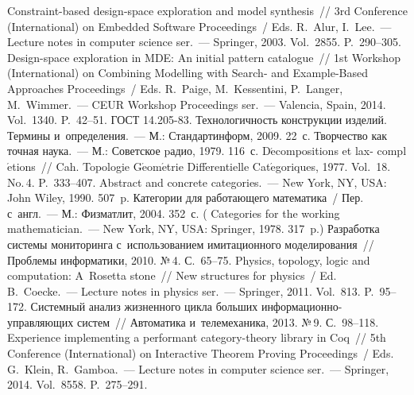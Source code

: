 \begin{multicols}{2}
{{\begin{thebibliography}{99}
 Constraint-based design-space exploration 
and model synthesis~// 3rd Conference (International) on Embedded Software Proceedings~/ Eds. 
R.~Alur, I.~Lee.~--- Lecture notes in computer science ser.~--- Springer, 2003. 
Vol.~2855. P.~290--305.
 Design-space exploration in 
MDE: An initial pattern catalogue~// 1st Workshop (International) on Combining Modelling with 
Search- and Example-Based Approaches Proceedings~/ Eds. R.~Paige, M.~Kessentini, P.~Langer, 
M.~Wimmer.~--- CEUR Workshop Proceedings ser.~---  Valencia, Spain, 2014. Vol.~1340. 
P.~42--51.
ГОСТ 14.205-83. Технологичность конструкции изделий. Термины и~определения.~--- М.: 
Стандартинформ, 2009. 22~с.
 Творчество как точная наука.~--- М.: Советское pадио, 1979. 116~с.
 D$\acute{\mbox{e}}$compositions et lax-
compl$\acute{\mbox{e}}$tions~// Cah. Topologie G$\acute{\mbox{e}}$om$\acute{\mbox{e}}$trie Diff$\acute{\mbox{e}}$rentielle 
Cat$\acute{\mbox{e}}$goriques, 1977. Vol.~18. No.\,4. P.~333--407.
 Abstract and concrete 
categories.~--- New York, NY, USA: John Wiley, 1990. 507~p.
 Категории для работающего математика~/ Пер. с~англ.~--- М.: Физматлит, 
2004. 352~с. ( Categories for the working mathematician.~--- New York, NY, 
USA: Springer, 1978. 317~p.)
 Разработка сис\-те\-мы мониторинга 
с~использованием имитационного моделирования~// Проблемы информатики, 2010. №\,4. 
С.~65--75.
 Physics, topology, logic and computation: A~Rosetta stone~// New 
structures for physics~/ Ed. B.~Coecke.~--- Lecture notes in physics ser.~--- 
Springer, 2011. Vol.~813.  
P.~95--172.
 Системный анализ жизненного цикла больших  
ин\-фор\-ма\-ци\-он\-но-управ\-ля\-ющих сис\-тем~// Автоматика и~телемеханика, 2013. №\,9. 
С.~98--118.
 Experience implementing a performant category-theory 
library in Coq~// 5th Conference (International) on Interactive Theorem Proving Proceedings~/ Eds. 
G.~Klein, R.~Gamboa.~--- Lecture notes in computer science ser.~--- Springer, 2014. Vol.~8558.  
P.~275--291.
 \end{thebibliography}

 }
 }

\end{multicols}

